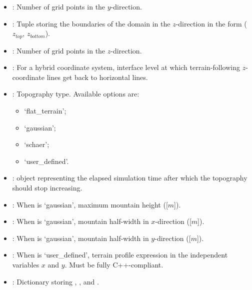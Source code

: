 \documentclass[letterpaper,10pt,english]{sphinxmanual}
\begin{document}
\begin{itemize}
\item {} 
: Number of grid points in the \(y\)-direction.

\item {} 
: Tuple storing the boundaries of the domain in the \(z\)-direction      in the form (\(z_{top}\), \(z_{bottom}\)).

\item {} 
: Number of grid points in the \(z\)-direction.

\item {} 
: For a hybrid coordinate system, interface level at which terrain-following      \(z\)-coordinate lines get back to horizontal lines.

\item {} 
: Topography type. Available options are:
\begin{itemize}
\item {} 
‘flat\_terrain’;

\item {} 
‘gaussian’;

\item {} 
‘schaer’;

\item {} 
‘user\_defined’.

\end{itemize}

\item {} 
:  object representing the elapsed simulation time                       after which the topography should stop increasing.

\item {} 
: When  is ‘gaussian’, maximum mountain height ({[}\(m\){]}).

\item {} 
: When  is ‘gaussian’, mountain half-width in \(x\)-direction     ({[}\(m\){]}).

\item {} 
: When  is ‘gaussian’, mountain half-width in \(y\)-direction     ({[}\(m\){]}).

\item {} 
: When  is ‘user\_defined’, terrain profile expression in the independent  variables \(x\) and \(y\). Must be fully C++-compliant.

\item {} 
: Dictionary storing , ,  and .

\end{itemize}
\end{document}
